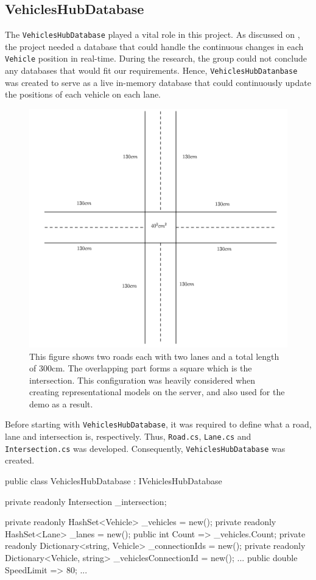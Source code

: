 \subsection{VehiclesHubDatabase}\label{sec:vehiclehubdatabase}
The \verb|VehiclesHubDatabase| played a vital role in this project. As discussed on , the project needed a database that could handle the continuous changes in each \verb|Vehicle| position in real-time. During the research, the group could not conclude any databases that would fit our requirements. Hence, \verb|VehiclesHubDatanbase| was created to serve as a live in-memory database that could continuously update the positions of each vehicle on each lane.
\begin{figure}[h!]
	\centering
	\includegraphics[width=1\linewidth]{figures/intersection_concept}
	\caption{This figure shows two roads each with two lanes and a total length of 300cm. The overlapping part forms a square which is the intersection. This configuration was heavily considered when creating representational models on the server, and also used for the demo as a result.}
	\label{fig:intersectionconcept}
\end{figure}

Before starting with \verb|VehiclesHubDatabase|, it was required to define what a road, lane and intersection is, respectively. Thus, \verb|Road.cs|, \verb|Lane.cs| and \verb|Intersection.cs| was developed. Consequently, \verb|VehiclesHubDatabase| was created.
\begin{csharp}
public class VehiclesHubDatabase : IVehiclesHubDatabase
{
	private readonly Intersection _intersection;
	
	private readonly HashSet<Vehicle> _vehicles = new();
	private readonly HashSet<Lane> _lanes = new();
	public int Count => _vehicles.Count;
	private readonly Dictionary<string, Vehicle> _connectionIds = new();
	private readonly Dictionary<Vehicle, string> _vehiclesConnectionId = new();
	...
	public double SpeedLimit => 80;
	...
}
\end{csharp}


